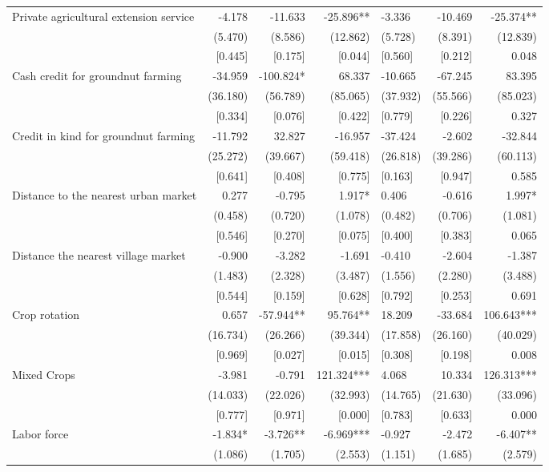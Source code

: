 \documentclass[
]{article}
\begin{document}
\begin{landscape}
\begin{ThreePartTable}
\begin{longtable}[t]{lrrrlrr}
Private agricultural extension service & -4.178 & -11.633 & -25.896** & -3.336 & -10.469 & -25.374**\\
 & (5.470) & (8.586) & (12.862) & (5.728) & (8.391) & (12.839)\\
 & {}[0.445] & {}[0.175] & {}[0.044] & {}[0.560] & {}[0.212] & 0.048\\
Cash credit for groundnut farming & -34.959 & -100.824* & 68.337 & -10.665 & -67.245 & 83.395\\
 & (36.180) & (56.789) & (85.065) & (37.932) & (55.566) & (85.023)\\
 & {}[0.334] & {}[0.076] & {}[0.422] & {}[0.779] & {}[0.226] & 0.327\\
Credit in kind for groundnut farming & -11.792 & 32.827 & -16.957 & -37.424 & -2.602 & -32.844\\
 & (25.272) & (39.667) & (59.418) & (26.818) & (39.286) & (60.113)\\
 & {}[0.641] & {}[0.408] & {}[0.775] & {}[0.163] & {}[0.947] & 0.585\\
Distance to the nearest urban market & 0.277 & -0.795 & 1.917* & 0.406 & -0.616 & 1.997*\\
 & (0.458) & (0.720) & (1.078) & (0.482) & (0.706) & (1.081)\\
 & {}[0.546] & {}[0.270] & {}[0.075] & {}[0.400] & {}[0.383] & 0.065\\
Distance the nearest village market & -0.900 & -3.282 & -1.691 & -0.410 & -2.604 & -1.387\\
 & (1.483) & (2.328) & (3.487) & (1.556) & (2.280) & (3.488)\\
 & {}[0.544] & {}[0.159] & {}[0.628] & {}[0.792] & {}[0.253] & 0.691\\
Crop rotation & 0.657 & -57.944** & 95.764** & 18.209 & -33.684 & 106.643***\\
 & (16.734) & (26.266) & (39.344) & (17.858) & (26.160) & (40.029)\\
 & {}[0.969] & {}[0.027] & {}[0.015] & {}[0.308] & {}[0.198] & 0.008\\
Mixed Crops & -3.981 & -0.791 & 121.324*** & 4.068 & 10.334 & 126.313***\\
 & (14.033) & (22.026) & (32.993) & (14.765) & (21.630) & (33.096)\\
 & {}[0.777] & {}[0.971] & {}[0.000] & {}[0.783] & {}[0.633] & 0.000\\
Labor force & -1.834* & -3.726** & -6.969*** & -0.927 & -2.472 & -6.407**\\
 & (1.086) & (1.705) & (2.553) & (1.151) & (1.685) & (2.579)\\

\end{longtable}
\end{ThreePartTable}
\end{landscape}
\end{document}
